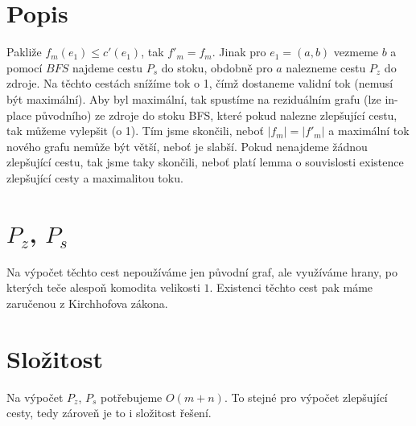 \documentclass[a4paper]{article}
\begin{document}
\renewcommand{\headrulewidth}{0pt} %
\thispagestyle{fancy} %
{}

\section*{Popis}
Pakliže $f_m (e_1) \le c'(e_1)$, tak $f'_m = f_m$. Jinak pro $e_1 = (a,b)$ vezmeme $b$ a pomocí $BFS$ najdeme cestu $P_s$ do stoku, obdobně pro $a$ nalezneme cestu $P_z$ do zdroje. Na těchto cestách snížíme tok o 1, čímž dostaneme validní tok (nemusí být maximální). Aby byl maximální, tak spustíme na reziduálním grafu (lze in-place původního) ze zdroje do stoku BFS, které pokud nalezne zlepšující cestu, tak můžeme vylepšit (o 1). Tím jsme skončili, neboť $|f_m| = |f'_m|$ a maximální tok nového grafu nemůže být větší, neboť je slabší. Pokud nenajdeme žádnou zlepšující cestu, tak jsme taky skončili, neboť platí lemma o souvislosti existence zlepšující cesty a maximalitou toku.


\section*{$P_z$, $P_s$}
Na výpočet těchto cest nepoužíváme jen původní graf, ale využíváme hrany, po kterých teče alespoň komodita velikosti $1$. Existenci těchto cest pak máme zaručenou z Kirchhofova zákona.

\section*{Složitost}
Na výpočet $P_z$, $P_s$ potřebujeme $O(m+n)$. To stejné pro výpočet zlepšující cesty, tedy zároveň je to i složitost řešení.
\end{document}
